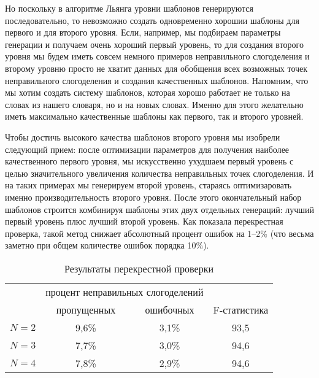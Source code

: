 \documentclass[12pt,a4paper,oneside]{extarticle}
\begin{document}
Но поскольку в алгоритме Льянга уровни шаблонов генерируются 
последовательно, то невозможно создать одновременно хорошии шаблоны для первого и для второго уровня. Если, например, мы подбираем параметры
генерации и получаем очень хороший первый уровень, то для создания второго уровня мы будем иметь совсем немного примеров неправильного
слогоделения и второму уровню просто не хватит данных для обобщения всех возможных точек неправильного слогоделения и создания качественных
шаблонов. Напомним, что мы хотим создать систему шаблонов, которая хорошо работает не только на словах из нашего словаря, но и на новых
словах. Именно для этого желательно иметь максимально качественные шаблоны как первого, так и второго уровней.

Чтобы достичь высокого качества шаблонов второго уровня мы изобрели следующий прием: после оптимизации параметров для получения
наиболее качественного первого уровня, мы искусственно ухудшаем первый уровень с целью значительного увеличения
количества неправильных точек слогоделения. И на таких примерах мы генерируем второй уровень, стараясь оптимизаровать именно
производительность второго уровня. После этого окончательный набор шаблонов строится комбинируя шаблоны этих двух отдельных
генераций: лучший первый уровень плюс лучший второй уровень. Как показала перекрестная проверка, такой метод снижает 
абсолютный процент ошибок на 1--2\% (что весьма заметно при общем количестве ошибок порядка 10\%).

\begin{table}[ht]
\centering
\caption{Результаты перекрестной проверки \label{validation_results}}
\begin{tabular}{cccc}
		&	\multicolumn{2}{c}{процент неправильных слогоделений} & \\
		&	пропущенных		& ошибочных	& F-статистика \\
\hline
$N = 2$	& 	9,6\%			& 	3,1\% 	&	93,5 \\
$N = 3$ 	& 	7,7\%			& 	3,0\% 	& 	94,6	\\
$N = 4$ 	&	7,8\%			& 	2,9\% 	& 	94,6	\\
\hline
\end{tabular}
\end{table}
\end{document}
